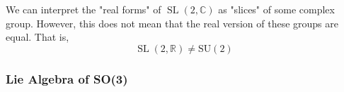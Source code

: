 \documentclass{article}
\DeclareMathOperator{\SL}{SL}
\begin{document}
    \begin{center}
    \end{center}
    We can interpret the "real forms" of $\SL(2, \mathbb{C})$ as "slices" of some complex group. However, this does not mean that the real version of these groups are equal. That is, 
    \begin{equation}
      \SL(2, \mathbb{R}) \neq \text{SU}(2)
    \end{equation}

  \subsubsection{Lie Algebra of SO(3)}
\end{document}
